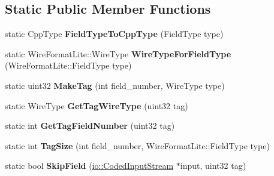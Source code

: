 \subsection*{Static Public Member Functions}
\begin{DoxyCompactItemize}
\item 
\mbox{\label{classgoogle_1_1protobuf_1_1internal_1_1WireFormatLite_aa97a4f94646066dc782e0c9f166ad147}} 
static Cpp\+Type {\bfseries Field\+Type\+To\+Cpp\+Type} (Field\+Type type)
\item 
\mbox{\label{classgoogle_1_1protobuf_1_1internal_1_1WireFormatLite_aa271771fab1bff6db2b396c99c7e8978}} 
static Wire\+Format\+Lite\+::\+Wire\+Type {\bfseries Wire\+Type\+For\+Field\+Type} (Wire\+Format\+Lite\+::\+Field\+Type type)
\item 
\mbox{\label{classgoogle_1_1protobuf_1_1internal_1_1WireFormatLite_af19df489143ee50c97e661946c7efb04}} 
static uint32 {\bfseries Make\+Tag} (int field\+\_\+number, Wire\+Type type)
\item 
\mbox{\label{classgoogle_1_1protobuf_1_1internal_1_1WireFormatLite_a3f6e4d1340d596b733f6ecaeaa5e57e3}} 
static Wire\+Type {\bfseries Get\+Tag\+Wire\+Type} (uint32 tag)
\item 
\mbox{\label{classgoogle_1_1protobuf_1_1internal_1_1WireFormatLite_a52dc5c640f0566a5c7895404daf56a55}} 
static int {\bfseries Get\+Tag\+Field\+Number} (uint32 tag)
\item 
\mbox{\label{classgoogle_1_1protobuf_1_1internal_1_1WireFormatLite_a914c5824edbf34013943b1cbe68736a9}} 
static int {\bfseries Tag\+Size} (int field\+\_\+number, Wire\+Format\+Lite\+::\+Field\+Type type)
\item 
\mbox{\label{classgoogle_1_1protobuf_1_1internal_1_1WireFormatLite_a910d3cd2972b5ab535ab828ad83a08c9}} 
static bool {\bfseries Skip\+Field} (\hyperlink{classgoogle_1_1protobuf_1_1io_1_1CodedInputStream}{io\+::\+Coded\+Input\+Stream} $\ast$input, uint32 tag)

\end{DoxyCompactItemize}
